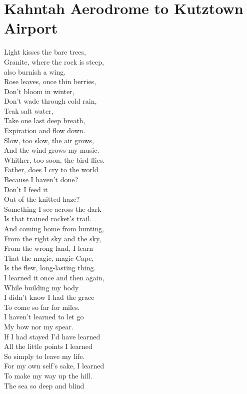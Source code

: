 \documentclass[smalldemyvopaper,11pt,twoside,onecolumn,openright,extrafontsizes]{memoir}
\begin{document}
\chapter{Kahntah Aerodrome to Kutztown Airport}
Light kisses the bare trees,
\\Granite, where the rock is steep,
\\also burnish a wing.
\\Rose leaves, once thin berries,
\\Don't bloom in winter,
\\Don't wade through cold rain,
\\Teak salt water,
\\Take one last deep breath,
\\Expiration and flow down.
\\Slow, too slow, the air grows,
\\And the wind grows my music.
\\Whither, too soon, the bird flies.
\\Father, does I cry to the world
\\Because I haven't done?
\\Don't I feed it
\\Out of the knitted haze?
\\Something I see across the dark
\\Is that trained rocket's trail.
\\And coming home from hunting,
\\From the right sky and the sky,
\\From the wrong land, I learn
\\That the magic, magic Cape,
\\Is the flew, long-lasting thing.
\\I learned it once and then again,
\\While building my body
\\I didn't know I had the grace
\\To come so far for miles.
\\I haven't learned to let go
\\My bow nor my spear.
\\If I had stayed I'd have learned
\\All the little points I learned
\\So simply to leave my life.
\\For my own self's sake, I learned
\\To make my way up the hill.
\\The sea so deep and blind
\end{document}

